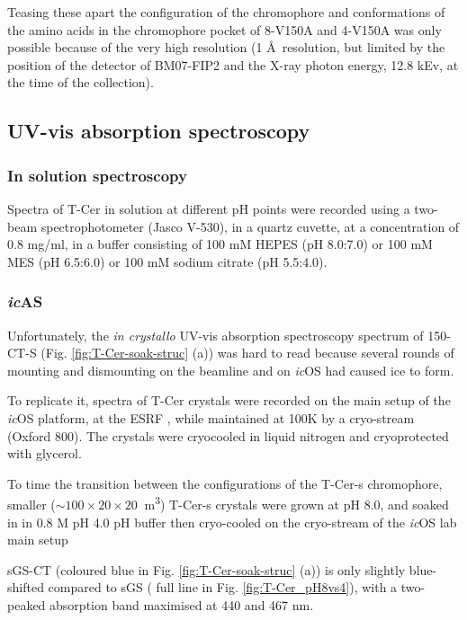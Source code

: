 Teasing these apart the configuration of the chromophore and conformations of the amino acids in the chromophore pocket of 8-V150A and 4-V150A was only possible because of the very high resolution (1 \AA\ resolution, but limited by the position of the detector of BM07-FIP2 and the X-ray photon energy, 12.8 kEv, at the time of the collection). 

\subsection{UV-vis absorption spectroscopy}

\subsubsection{In solution spectroscopy}
Spectra of T-Cer in solution at different pH points were recorded using a two-beam spectrophotometer (Jasco V-530), in a quartz cuvette, at a concentration of 0.8 mg/ml, in a buffer consisting of 100 mM HEPES (pH 8.0:7.0) or 100 mM MES (pH 6.5:6.0) or 100 mM sodium citrate (pH 5.5:4.0).

\subsubsection{\textit{ic}AS}
Unfortunately, the \textit{in crystallo} UV-vis absorption spectroscopy spectrum of 150-CT-S (Fig. \ref{fig:T-Cer-soak-struc} (a)) was hard to read because several rounds of mounting and dismounting on the beamline and on \textit{ic}OS had caused ice to form. 

To replicate it, spectra of T-Cer crystals were recorded on the main setup of the \textit{ic}OS platform, at the ESRF \parencite{vonstettenCrystalloOpticalSpectroscopy2015}, while maintained at 100K by a cryo-stream (Oxford 800). The crystals were cryocooled in liquid nitrogen and cryoprotected with glycerol. 

To time the transition between the configurations of the T-Cer-s chromophore, smaller (\(\sim 100 \times 20 \times 20 \ \) \textmu m\textsuperscript{3}) T-Cer-s crystals were grown at pH 8.0, and soaked in in 0.8 M pH 4.0 pH buffer then cryo-cooled on the cryo-stream of the \textit{ic}OS lab main setup 

sGS-CT (coloured blue in Fig. \ref{fig:T-Cer-soak-struc} (a)) is only slightly blue-shifted compared to sGS ( full line in Fig. \ref{fig:T-Cer_pH8vs4}), with a two-peaked absorption band maximised at 440 and 467 nm. 

